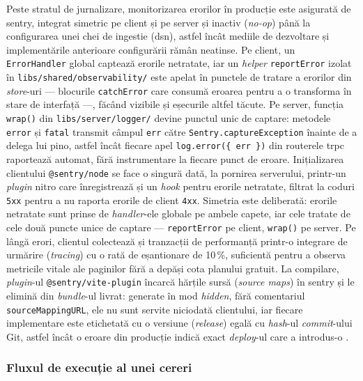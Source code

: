 Peste stratul de jurnalizare, monitorizarea erorilor în producție este asigurată de \gls{sentry}, integrat simetric pe client și pe server și inactiv (\textit{no-op}) până la configurarea unei chei de ingestie (\acrshort{dsn}), astfel încât mediile de dezvoltare și implementările anterioare configurării rămân neatinse. Pe client, un \texttt{ErrorHandler} global captează erorile netratate, iar un \textit{helper} \texttt{reportError} izolat în \texttt{libs/shared/observability/} este apelat în punctele de tratare a erorilor din \textit{store}-uri --- blocurile \texttt{catchError} care consumă eroarea pentru a o transforma în stare de interfață ---, făcând vizibile și eșecurile altfel tăcute. Pe server, funcția \texttt{wrap()} din \texttt{libs/server/logger/} devine punctul unic de captare: metodele \texttt{error} și \texttt{fatal} transmit câmpul \texttt{err} către \texttt{Sentry.captureException} înainte de a delega lui \gls{pino}, astfel încât fiecare apel \texttt{log.error(\{ err \})} din routerele \gls{trpc} raportează automat, fără instrumentare la fiecare punct de eroare. Inițializarea clientului \texttt{@sentry/node} se face o singură dată, la pornirea serverului, printr-un \textit{plugin} \gls{nitro} care înregistrează și un \textit{hook} pentru erorile netratate, filtrat la coduri \texttt{5xx} pentru a nu raporta erorile de client \texttt{4xx}. Simetria este deliberată: erorile netratate sunt prinse de \textit{handler}-ele globale pe ambele capete, iar cele tratate de cele două puncte unice de captare --- \texttt{reportError} pe client, \texttt{wrap()} pe server. Pe lângă erori, clientul colectează și tranzacții de performanță printr-o integrare de urmărire (\textit{tracing}) cu o rată de eșantionare de 10\,\%, suficientă pentru a observa metricile vitale ale paginilor fără a depăși cota planului gratuit. La compilare, \textit{plugin}-ul \texttt{@sentry/\allowbreak vite-plugin} încarcă hărțile sursă (\textit{source maps}) în \gls{sentry} și le elimină din \textit{bundle}-ul livrat: generate în mod \textit{hidden}, fără comentariul \texttt{sourceMappingURL}, ele nu sunt servite niciodată clientului, iar fiecare implementare este etichetată cu o versiune (\textit{release}) egală cu \textit{hash}-ul \textit{commit}-ului Git, astfel încât o eroare din producție indică exact \textit{deploy}-ul care a introdus-o \cite{sentry}.

\subsubsection{Fluxul de execuție al unei cereri}\label{subsec:flux-executie}

